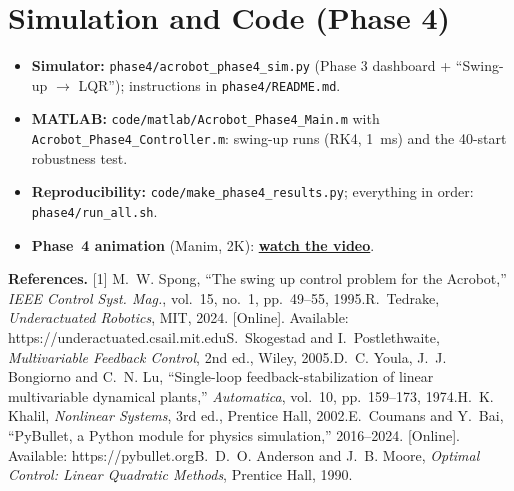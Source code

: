 \documentclass[10pt,letterpaper]{article}
\newenvironment{keep}{\par\noindent\begin{minipage}{\linewidth}}{\end{minipage}\par\smallskip}
\begin{document}
\begin{keep}
\section{Simulation and Code (Phase 4)}
\begin{itemize}
\item \textbf{Simulator:} \texttt{phase4/acrobot\_phase4\_sim.py} (Phase 3 dashboard + ``Swing-up $\to$ LQR''); instructions in \texttt{phase4/README.md}.
\item \textbf{MATLAB:} \texttt{code/matlab/Acrobot\_Phase4\_Main.m} with \texttt{Acrobot\_Phase4\_Controller.m}: swing-up runs (RK4, 1~ms) and the 40-start robustness test.
\item \textbf{Reproducibility:} \texttt{code/make\_phase4\_results.py}; everything in order: \texttt{phase4/run\_all.sh}.
\item \textbf{Phase~4 animation} (Manim, 2K): \href{https://drive.google.com/file/d/1jPQRn3W-bvUyvSKlHvYmX74bfPX9N16P/view?usp=sharing}{\textcolor{blue!60!black}{\textbf{watch the video}}}.
\end{itemize}
\end{keep}

\begin{keep}
\vspace{6pt}
\begin{singlespace}
{\footnotesize
\textbf{References.}
[1] M.~W. Spong, ``The swing up control problem for the Acrobot,'' \emph{IEEE Control Syst. Mag.}, vol.~15, no.~1, pp.~49--55, 1995.\quad
[2] R.~Tedrake, \emph{Underactuated Robotics}, MIT, 2024. [Online]. Available: https://underactuated.csail.mit.edu\quad
[3] S.~Skogestad and I.~Postlethwaite, \emph{Multivariable Feedback Control}, 2nd ed., Wiley, 2005.\quad
[4] D.~C. Youla, J.~J. Bongiorno and C.~N. Lu, ``Single-loop feedback-stabilization of linear multivariable dynamical plants,'' \emph{Automatica}, vol.~10, pp.~159--173, 1974.\quad
[5] H.~K. Khalil, \emph{Nonlinear Systems}, 3rd ed., Prentice Hall, 2002.\quad
[6] E.~Coumans and Y.~Bai, ``PyBullet, a Python module for physics simulation,'' 2016--2024. [Online]. Available: https://pybullet.org\quad
[7] B.~D.~O. Anderson and J.~B. Moore, \emph{Optimal Control: Linear Quadratic Methods}, Prentice Hall, 1990.\par}
\end{singlespace}
\end{keep}
\end{document}
